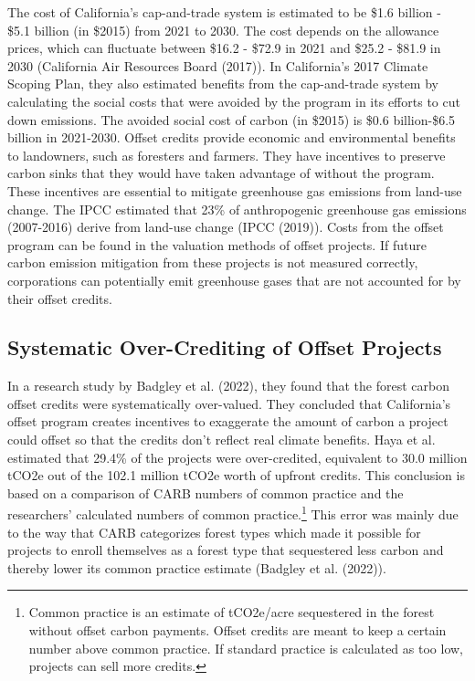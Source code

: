 \documentclass[11pt]{article}
\begin{document}
The cost of California's cap-and-trade system is estimated to be \$1.6 billion - \$5.1 billion (in \$2015) from 2021 to 2030. The cost depends on the allowance prices, which can fluctuate between \$16.2 - \$72.9 in 2021 and \$25.2 - \$81.9 in 2030 (California Air Resources Board (2017)). In California's 2017 Climate Scoping Plan, they also estimated benefits from the cap-and-trade system by calculating the social costs that were avoided by the program in its efforts to cut down emissions. The avoided social cost of carbon (in \$2015) is \$0.6 billion-\$6.5 billion in 2021-2030. Offset credits provide economic and environmental benefits to landowners, such as foresters and farmers. They have incentives to preserve carbon sinks that they would have taken advantage of without the program. These incentives are essential to mitigate greenhouse gas emissions from land-use change. The IPCC estimated that 23\% of anthropogenic greenhouse gas emissions (2007-2016) derive from land-use change (IPCC (2019)). Costs from the offset program can be found in the valuation methods of offset projects. If future carbon emission mitigation from these projects is not measured correctly, corporations can potentially emit greenhouse gases that are not accounted for by their offset credits.


\subsection*{Systematic Over-Crediting of Offset Projects}

In a research study by Badgley et al. (2022), they found that the forest carbon offset credits were systematically over-valued. They concluded that California's offset program creates incentives to exaggerate the amount of carbon a project could offset so that the credits don't reflect real climate benefits. Haya et al. estimated that 29.4\% of the projects were over-credited, equivalent to 30.0 million tCO2e out of the 102.1 million tCO2e worth of upfront credits. This conclusion is based on a comparison of CARB numbers of common practice and the researchers' calculated numbers of common practice.\footnote{Common practice is an estimate of tCO2e/acre sequestered in the forest without offset carbon payments. Offset credits are meant to keep a certain number above common practice. If standard practice is calculated as too low, projects can sell more credits.} This error was mainly due to the way that CARB categorizes forest types which made it possible for projects to enroll themselves as a forest type that sequestered less carbon and thereby lower its common practice estimate (Badgley et al. (2022)).
\end{document}
